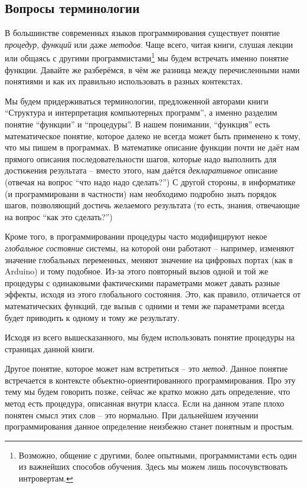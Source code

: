 \documentclass[../sparc.tex]{subfiles}
\begin{document}
\subsection{Вопросы терминологии}

В большинстве современных языков программирования существует понятие
\emph{процедур}, \emph{функций} или даже \emph{методов}.  Чаще всего, читая
книги, слушая лекции или общаясь с другими программистами\footnote{Возможно,
общение с другими, более опытными, программистами есть один из важнейших
способов обучения.  Здесь мы можем лишь посочувствовать интровертам.} мы будем
встречать именно понятие функции.  Давайте же разберёмся, в чём же разница между
перечисленными нами понятиями и как их правильно использовать в разных
контекстах.

Мы будем придерживаться терминологии, предложенной\cite[28]{sicp-en} авторами
книги ``Структура и интерпретация компьютерных программ'', а именно разделим
понятие ``функции'' и ``процедуры''.  В нашем понимании, ``функция'' есть
математическое понятие, которое далеко не всегда может быть применено к тому,
что мы пишем в программах.  В математике описание функции почти не даёт нам
прямого описания последовательности шагов, которые надо выполнить для достижения
результата -- вместо этого, нам даётся \emph{декларативное} описание (отвечая на
вопрос ``что надо надо сделать?'')  С другой стороны, в информатике (и
программировани в частности) нам необходимо подробно знать порядок шагов,
позволяющий достичь желаемого результата (то есть, знания, отвечающие на вопрос
``как это сделать?'')

Кроме того, в программировании процедуры часто модифицируют некое
\emph{глобальное состояние} системы, на которой они работают -- например,
изменяют значение глобальных переменных, меняют значение на цифровых портах (как
в Arduino) и тому подобное.  Из-за этого повторный вызов одной и той же
процедуры с одинаковыми фактическими параметрами может давать разные эффекты,
исходя из этого глобального состояния.  Это, как правило, отличается от
математических функций, где вызыв с одними и теми же параметрами всегда будет
приводить к одному и тому же результату.

Исходя из всего вышесказанного, мы будем использовать понятие процедуры на
страницах данной книги.

Другое понятие, которое может нам встретиться -- это \emph{метод}.  Данное
понятие встречается в контексте объектно-ориентированного программирования.  Про
эту тему мы будем говорить позже, сейчас же кратко можно дать определение, что
метод есть процедура, описанная внутри класса.  Если на данном этапе плохо
понятен смысл этих слов -- это нормально.  При дальнейшем изучении
программирования данное определение неизбежно станет понятным и простым.
\end{document}
